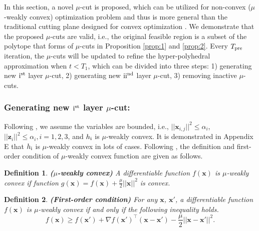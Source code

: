 \documentclass[letterpaper]{article}
\newtheorem{definition}{Definition}
\begin{document}
In this section, a novel $\mu$-cut is proposed, which can be utilized for non-convex ($\mu$-weakly convex) optimization problem and thus is more general than the traditional cutting plane designed for convex optimization  \cite{jiao2022asynchronous,franc2011cutting}. We demonstrate that the proposed $\mu$-cuts are valid, i.e., the original feasible region is a subset of the polytope that forms of $\mu$-cuts in Proposition \ref{prop:1} and \ref{prop:2}.  Every $T_{\rm{pre}}$ iteration, the $\mu$-cuts will be updated to refine the hyper-polyhedral approximation when $t<T_1$, which can be divided into three steps: 1) generating new ${\rm{\uppercase\expandafter{\romannumeral1}}}^{\rm{st}}$ layer $\mu$-cut, 2) generating new ${\rm{\uppercase\expandafter{\romannumeral2}}}^{\rm{nd}}$ layer $\mu$-cut, 3) removing inactive $\mu$-cuts.

\subsubsection{Generating new ${\rm{\uppercase\expandafter{\romannumeral1}}}^{\rm{st}}$ layer $\mu$-cut:}

Following \cite{qian2019robust}, we assume the variables are bounded, i.e., $||\boldsymbol{x}_{i,j}||^2\!\le\!\alpha_i$, $||\boldsymbol{z}_i||^2\!\le\!\alpha_i,i\!=\!1,2,3$, and $h_{\rm{\uppercase\expandafter{\romannumeral1}}}$ is $\mu$-weakly convex. It is demonstrated in Appendix E that  $h_{\rm{\uppercase\expandafter{\romannumeral1}}}$ is $\mu$-weakly convex in lots of cases. Following \cite{xie2019asynchronous,davis2019stochastic}, the definition and first-order condition of $\mu$-weakly convex function are given as follows.


\begin{definition}
\textbf{($\mu$-weakly convex)} A differentiable function $f(\boldsymbol{x})$ is $\mu$-weakly convex if function $g(\boldsymbol{x})=f(\boldsymbol{x})+\frac{\mu}{2}||\boldsymbol{x}||^2$ is convex. %
\end{definition}


\begin{definition}
\label{def:2}
\textbf{(First-order condition)} For any $\boldsymbol{x}$, $\boldsymbol{x}'$, a differentiable function $f(\boldsymbol{x})$ is $\mu$-weakly convex if and only if the following inequality holds.
\begin{equation}
f(\boldsymbol{x})\ge f(\boldsymbol{x}') + \nabla f(\boldsymbol{x}')^{\top}(\boldsymbol{x}-\boldsymbol{x}') - \frac{\mu}{2} ||\boldsymbol{x}-\boldsymbol{x}'||^2.
\end{equation}
\end{definition}
\end{document}
